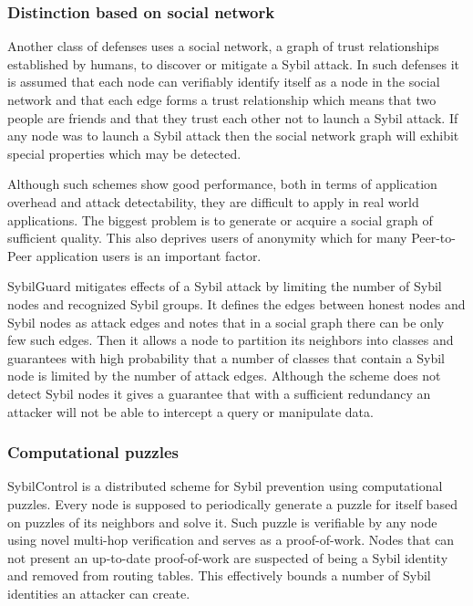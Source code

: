   \subsubsection{Distinction based on social network}

  Another class of defenses uses a social network, a graph of trust
  relationships established by humans, to discover or mitigate a Sybil attack.
  In such defenses it is assumed that each node can verifiably identify itself
  as a node in the social network and that each edge forms a trust relationship
  which means that two people are friends and that they trust each other not to
  launch a Sybil attack. If any node was to launch a Sybil attack then the
  social network graph will exhibit special properties which may be detected. 

  Although such schemes show good performance, both in terms of application
  overhead and attack detectability, they are difficult to apply in real world
  applications. The biggest problem is to generate or acquire a social graph of
  sufficient quality. This also deprives users of anonymity which for many
  Peer-to-Peer application users is an important factor.

  SybilGuard \cite{hai06} mitigates effects of a Sybil attack by limiting the
  number of Sybil nodes and recognized Sybil groups. It defines the edges
  between honest nodes and Sybil nodes as attack edges and notes that in a
  social graph there can be only few such edges. Then it allows a node to
  partition its neighbors into classes and guarantees with high probability
  that a number of classes that contain a Sybil node is limited by the number of
  attack edges. Although the scheme does not detect Sybil nodes it gives a
  guarantee that with a sufficient redundancy an attacker will not be able to
  intercept a query or manipulate data.

  \subsubsection{Computational puzzles}
  SybilControl\cite{li12} is a distributed scheme for Sybil prevention using
  computational puzzles. Every node is supposed to periodically generate a
  puzzle for itself based on puzzles of its neighbors and solve it. Such puzzle
  is verifiable by any node using novel multi-hop verification and serves as a
  proof-of-work. Nodes that can not present an up-to-date proof-of-work are
  suspected of being a Sybil identity and removed from routing tables. This
  effectively bounds a number of Sybil identities an attacker can create.

